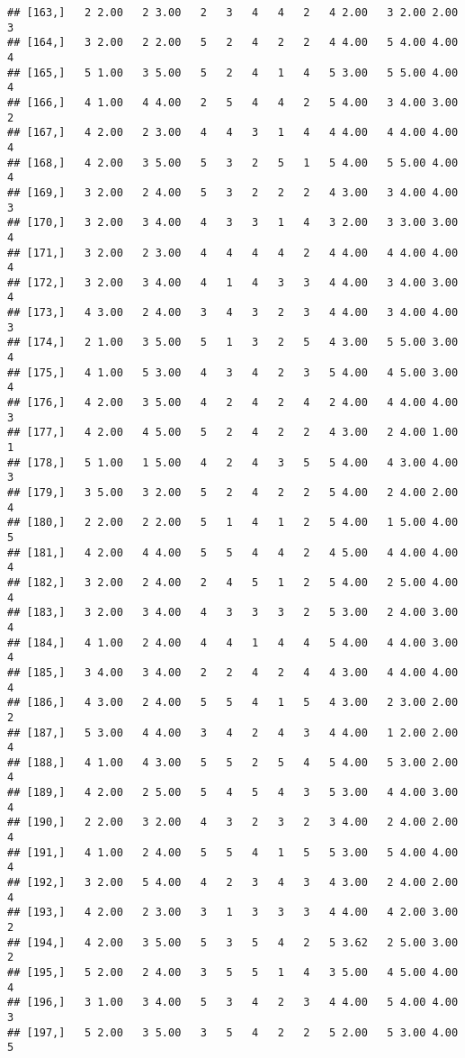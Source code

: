 \documentclass[]{article}
\begin{document}
\begin{verbatim}
## [163,]   2 2.00   2 3.00   2   3   4   4   2   4 2.00   3 2.00 2.00   3
## [164,]   3 2.00   2 2.00   5   2   4   2   2   4 4.00   5 4.00 4.00   4
## [165,]   5 1.00   3 5.00   5   2   4   1   4   5 3.00   5 5.00 4.00   4
## [166,]   4 1.00   4 4.00   2   5   4   4   2   5 4.00   3 4.00 3.00   2
## [167,]   4 2.00   2 3.00   4   4   3   1   4   4 4.00   4 4.00 4.00   4
## [168,]   4 2.00   3 5.00   5   3   2   5   1   5 4.00   5 5.00 4.00   4
## [169,]   3 2.00   2 4.00   5   3   2   2   2   4 3.00   3 4.00 4.00   3
## [170,]   3 2.00   3 4.00   4   3   3   1   4   3 2.00   3 3.00 3.00   4
## [171,]   3 2.00   2 3.00   4   4   4   4   2   4 4.00   4 4.00 4.00   4
## [172,]   3 2.00   3 4.00   4   1   4   3   3   4 4.00   3 4.00 3.00   4
## [173,]   4 3.00   2 4.00   3   4   3   2   3   4 4.00   3 4.00 4.00   3
## [174,]   2 1.00   3 5.00   5   1   3   2   5   4 3.00   5 5.00 3.00   4
## [175,]   4 1.00   5 3.00   4   3   4   2   3   5 4.00   4 5.00 3.00   4
## [176,]   4 2.00   3 5.00   4   2   4   2   4   2 4.00   4 4.00 4.00   3
## [177,]   4 2.00   4 5.00   5   2   4   2   2   4 3.00   2 4.00 1.00   1
## [178,]   5 1.00   1 5.00   4   2   4   3   5   5 4.00   4 3.00 4.00   3
## [179,]   3 5.00   3 2.00   5   2   4   2   2   5 4.00   2 4.00 2.00   4
## [180,]   2 2.00   2 2.00   5   1   4   1   2   5 4.00   1 5.00 4.00   5
## [181,]   4 2.00   4 4.00   5   5   4   4   2   4 5.00   4 4.00 4.00   4
## [182,]   3 2.00   2 4.00   2   4   5   1   2   5 4.00   2 5.00 4.00   4
## [183,]   3 2.00   3 4.00   4   3   3   3   2   5 3.00   2 4.00 3.00   4
## [184,]   4 1.00   2 4.00   4   4   1   4   4   5 4.00   4 4.00 3.00   4
## [185,]   3 4.00   3 4.00   2   2   4   2   4   4 3.00   4 4.00 4.00   4
## [186,]   4 3.00   2 4.00   5   5   4   1   5   4 3.00   2 3.00 2.00   2
## [187,]   5 3.00   4 4.00   3   4   2   4   3   4 4.00   1 2.00 2.00   4
## [188,]   4 1.00   4 3.00   5   5   2   5   4   5 4.00   5 3.00 2.00   4
## [189,]   4 2.00   2 5.00   5   4   5   4   3   5 3.00   4 4.00 3.00   4
## [190,]   2 2.00   3 2.00   4   3   2   3   2   3 4.00   2 4.00 2.00   4
## [191,]   4 1.00   2 4.00   5   5   4   1   5   5 3.00   5 4.00 4.00   4
## [192,]   3 2.00   5 4.00   4   2   3   4   3   4 3.00   2 4.00 2.00   4
## [193,]   4 2.00   2 3.00   3   1   3   3   3   4 4.00   4 2.00 3.00   2
## [194,]   4 2.00   3 5.00   5   3   5   4   2   5 3.62   2 5.00 3.00   2
## [195,]   5 2.00   2 4.00   3   5   5   1   4   3 5.00   4 5.00 4.00   4
## [196,]   3 1.00   3 4.00   5   3   4   2   3   4 4.00   5 4.00 4.00   3
## [197,]   5 2.00   3 5.00   3   5   4   2   2   5 2.00   5 3.00 4.00   5

\end{verbatim}
\end{document}
